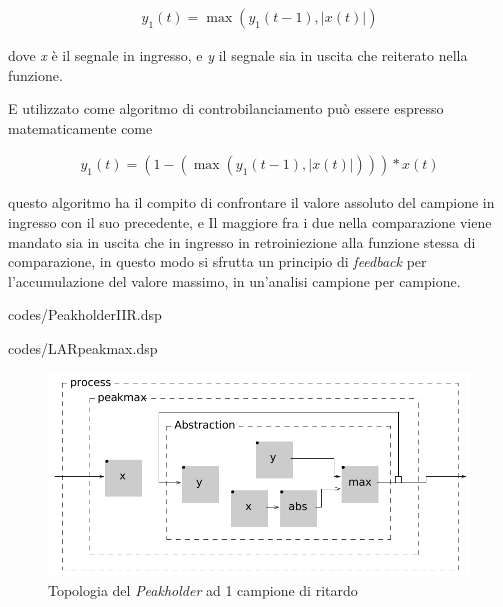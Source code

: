 \begin{align*} 
    y_{1}(t) = \max\left( y_{1}(t\!-\!1), \left\lvert{x(t)}\right\rvert \right) 
\end{align*}

dove \textit{x} è il segnale in ingresso, e \textit{y} il segnale sia in uscita che reiterato nella funzione. 

E utilizzato come algoritmo di controbilanciamento può essere espresso matematicamente come

\begin{align*} 
    y_{1}(t) = (1-(\max\left( y_{1}(t\!-\!1), \left\lvert{x(t)}\right\rvert \right))) * x(t)
\end{align*}

questo algoritmo ha il compito di confrontare il valore assoluto del campione in ingresso con il suo precedente,
e Il maggiore fra i due nella comparazione viene mandato sia in uscita che in ingresso 
in retroiniezione alla funzione stessa di comparazione, 
in questo modo si sfrutta un principio di \emph{feedback} per l'accumulazione
del valore massimo, in un'analisi campione per campione.

\vspace{0.5cm} 

{codes/PeakholderIIR.dsp}

\vspace{0.5cm} 

{codes/LARpeakmax.dsp}

\clearpage 

\begin{figure}[h!]
\begin{center}
    \includegraphics[width=14cm]{figures/PeakholderIIR.pdf}
    \caption{Topologia del \textit{Peakholder} ad 1 campione di ritardo} 
    \end{center}
\end{figure} 

